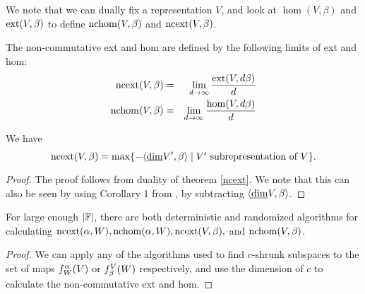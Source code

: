We note that we can dually fix a representation $V$, and look at $\hom(V,\beta)$ and $\operatorname{ext}(V,\beta)$ to define $\operatorname{nchom}(V,\beta)$ and $\operatorname{ncext}(V,\beta)$. 
\begin{definition} The non-commutative ext and hom are defined by the following limits of ext and hom:
\begin{eqnarray*}
\operatorname{ncext}(V,\beta)&=&\lim_{d\to\infty}\frac{\operatorname{ext}(V,d\beta)}{d}\\
\operatorname{nchom}(V,\beta)&=&\lim_{d\to\infty}\frac{\hom(V,d\beta)}{d}
\end{eqnarray*}
\end{definition}
\begin{theorem}
We have
$$
\operatorname{ncext}(V,\beta)=\max\{-\langle \underline{\rm dim} V', \beta \rangle \mid \mbox{$V'$ subrepresentation of $V$}\}.
$$
\begin{proof}
The proof follows from duality of theorem \ref{ncext}. We note that this can also be seen by using Corollary 1 from \cite{Craw96}, by subtracting $\langle \underline{\rm dim} V, \beta \rangle$.
\end{proof}
\end{theorem}

\begin{corr}
For large enough $|{\mathbb F}|$, there are both deterministic and randomized algorithms for calculating $\operatorname{ncext}(\alpha,W),\operatorname{nchom}(\alpha,W),\operatorname{ncext}(V,\beta),$ and $\operatorname{nchom}(V,\beta)$.
\begin{proof}
We can apply any of the algorithms used to find $c$-shrunk subspaces to the set of maps $f_{W}^{\alpha}({V})$ or $f_{\beta}^{V}(W)$ respectively, and use the dimension of $c$ to calculate the non-commutative ext and hom.
\end{proof}
\end{corr}
